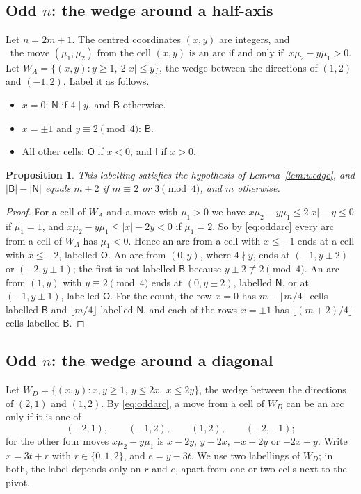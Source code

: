 \documentclass[11pt]{amsart}
\newtheorem{proposition}[theorem]{Proposition}
\theoremstyle{remark}
\begin{document}
\subsection*{Odd $n$: the wedge around a half-axis}
Let $n=2m+1$. The centred coordinates $(x,y)$ are integers, and
\begin{equation}\label{eq:oddarc}
\text{the move $(\mu_1,\mu_2)$ from the cell $(x,y)$ is an arc if and only if }\ x\mu_2-y\mu_1>0.
\end{equation}
Let $W_A=\{(x,y):y\ge1,\ 2|x|\le y\}$, the wedge between the directions of $(1,2)$ and $(-1,2)$. Label it as follows.
\begin{itemize}
\item $x=0$: $\mathsf N$ if $4\mid y$, and $\mathsf B$ otherwise.
\item $x=\pm1$ and $y\equiv2\pmod4$: $\mathsf B$.
\item All other cells: $\mathsf O$ if $x<0$, and $\mathsf I$ if $x>0$.
\end{itemize}

\begin{proposition}\label{prop:axislabel}
This labelling satisfies the hypothesis of Lemma~\ref{lem:wedge}, and $|\mathsf B|-|\mathsf N|$ equals $m+2$ if
$m\equiv2$ or $3\pmod4$, and $m$ otherwise.
\end{proposition}
\begin{proof}
For a cell of $W_A$ and a move with $\mu_1>0$ we have $x\mu_2-y\mu_1\le2|x|-y\le0$ if $\mu_1=1$, and
$x\mu_2-y\mu_1\le|x|-2y<0$ if $\mu_1=2$. So by \eqref{eq:oddarc} every arc from a cell of $W_A$ has $\mu_1<0$. Hence an arc
from a cell with $x\le-1$ ends at a cell with $x\le-2$, labelled $\mathsf O$. An arc from $(0,y)$, where $4\nmid y$,
ends at $(-1,y\pm2)$ or $(-2,y\pm1)$; the first is not labelled $\mathsf B$ because $y\pm2\not\equiv2\pmod4$. An arc
from $(1,y)$ with $y\equiv2\pmod4$ ends at $(0,y\pm2)$, labelled $\mathsf N$, or at $(-1,y\pm1)$, labelled
$\mathsf O$. For the count, the row $x=0$ has $m-\lfloor m/4\rfloor$ cells labelled $\mathsf B$ and $\lfloor m/4\rfloor$
labelled $\mathsf N$, and each of the rows $x=\pm1$ has $\lfloor(m+2)/4\rfloor$ cells labelled $\mathsf B$.
\end{proof}

\subsection*{Odd $n$: the wedge around a diagonal}
Let $W_D=\{(x,y):x,y\ge1,\ y\le2x,\ x\le2y\}$, the wedge between the directions of $(2,1)$ and $(1,2)$. By
\eqref{eq:oddarc}, a move from a cell of $W_D$ can be an arc only if it is one of
\[ (-2,1),\qquad(-1,2),\qquad(1,2),\qquad(-2,-1); \]
for the other four moves $x\mu_2-y\mu_1$ is $x-2y$, $y-2x$, $-x-2y$ or $-2x-y$. Write $x=3t+r$ with $r\in\{0,1,2\}$,
and $e=y-3t$. We use two labellings of $W_D$; in both, the label depends only on $r$ and $e$, apart from one or two
cells next to the pivot.
\end{document}
